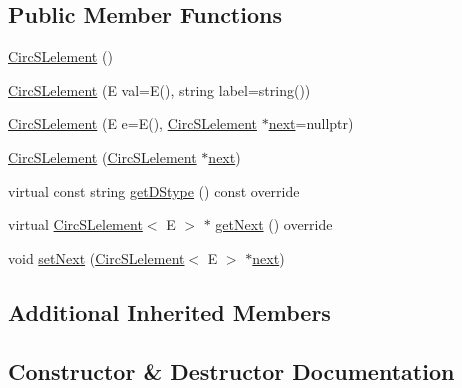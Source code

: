 \subsection*{Public Member Functions}
\begin{DoxyCompactItemize}
\item 
\mbox{\hyperlink{classbridges_1_1datastructure_1_1_circ_s_lelement_a3c79c117602d95cb150517b38442652e}{Circ\+S\+Lelement}} ()
\item 
\mbox{\hyperlink{classbridges_1_1datastructure_1_1_circ_s_lelement_a77f564922261b58522ddb244a8cea0dc}{Circ\+S\+Lelement}} (E val=E(), string label=string())
\item 
\mbox{\hyperlink{classbridges_1_1datastructure_1_1_circ_s_lelement_aaedaa1d980bd5a66511b57cd20a8d94c}{Circ\+S\+Lelement}} (E e=E(), \mbox{\hyperlink{classbridges_1_1datastructure_1_1_circ_s_lelement}{Circ\+S\+Lelement}} $\ast$\mbox{\hyperlink{classbridges_1_1datastructure_1_1_s_lelement_afc016a593a4a5aba82021ee34edadbfc}{next}}=nullptr)
\item 
\mbox{\hyperlink{classbridges_1_1datastructure_1_1_circ_s_lelement_a89f06ba76b1fdf1d2343c5f18f226722}{Circ\+S\+Lelement}} (\mbox{\hyperlink{classbridges_1_1datastructure_1_1_circ_s_lelement}{Circ\+S\+Lelement}} $\ast$\mbox{\hyperlink{classbridges_1_1datastructure_1_1_s_lelement_afc016a593a4a5aba82021ee34edadbfc}{next}})
\item 
virtual const string \mbox{\hyperlink{classbridges_1_1datastructure_1_1_circ_s_lelement_a775ba08a7811fe91c396cb27ba9343ab}{get\+D\+Stype}} () const override
\item 
virtual \mbox{\hyperlink{classbridges_1_1datastructure_1_1_circ_s_lelement}{Circ\+S\+Lelement}}$<$ E $>$ $\ast$ \mbox{\hyperlink{classbridges_1_1datastructure_1_1_circ_s_lelement_aff77056ace1361a35a09dc006eba34a3}{get\+Next}} () override
\item 
void \mbox{\hyperlink{classbridges_1_1datastructure_1_1_circ_s_lelement_a623d302217fce43a444e6da5e1de9b40}{set\+Next}} (\mbox{\hyperlink{classbridges_1_1datastructure_1_1_circ_s_lelement}{Circ\+S\+Lelement}}$<$ E $>$ $\ast$\mbox{\hyperlink{classbridges_1_1datastructure_1_1_s_lelement_afc016a593a4a5aba82021ee34edadbfc}{next}})
\end{DoxyCompactItemize}
\subsection*{Additional Inherited Members}


\subsection{Constructor \& Destructor Documentation}
\mbox{\label{classbridges_1_1datastructure_1_1_circ_s_lelement_a3c79c117602d95cb150517b38442652e}} 
